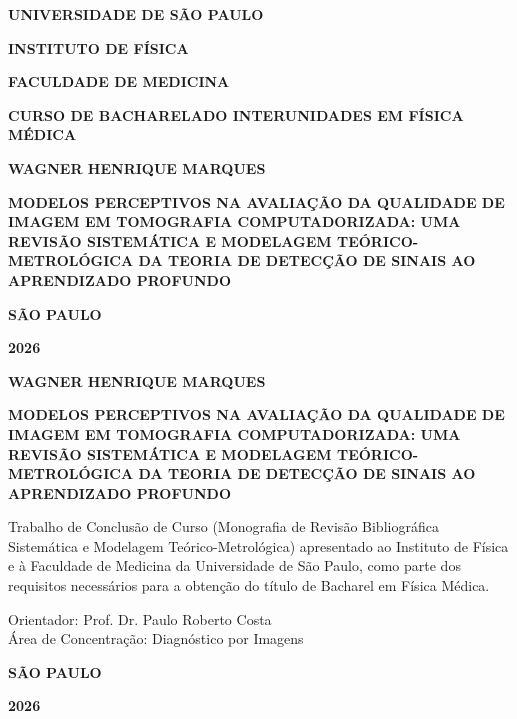 \documentclass[
  12pt,
  a4paper,
  oneside
]{report}
\newcommand{\tccuniversidade}{UNIVERSIDADE DE SÃO PAULO}
\newcommand{\tccinstituto}{INSTITUTO DE FÍSICA}
\newcommand{\tccdepartamento}{FACULDADE DE MEDICINA}
\newcommand{\tcccurso}{CURSO DE BACHARELADO INTERUNIDADES EM FÍSICA MÉDICA}
\newcommand{\tccautor}{WAGNER HENRIQUE MARQUES}
\newcommand{\tcctitulo}{MODELOS PERCEPTIVOS NA AVALIAÇÃO DA QUALIDADE DE IMAGEM EM TOMOGRAFIA COMPUTADORIZADA: UMA REVISÃO SISTEMÁTICA E MODELAGEM TEÓRICO-METROLÓGICA DA TEORIA DE DETECÇÃO DE SINAIS AO APRENDIZADO PROFUNDO}
\newcommand{\tccorientador}{Prof. Dr. Paulo Roberto Costa}
\newcommand{\tccarea}{Diagnóstico por Imagens}
\newcommand{\tcccidade}{SÃO PAULO}
\newcommand{\tccano}{2026}
\begin{document}
\pagestyle{empty}

\begin{center}
  {\bfseries\large \tccuniversidade \par}
  {\bfseries\large \tccinstituto \par}
  {\bfseries\large \tccdepartamento \par}
  {\bfseries\normalsize \tcccurso \par}

  \vspace{3.5cm}

  {\bfseries\Large \tccautor \par}

  \vspace{3.0cm}

  {\bfseries\large \tcctitulo \par}

  \vfill

  {\bfseries\large \tcccidade \par}
  {\bfseries\large \tccano \par}
\end{center}
\clearpage

\begin{center}
  {\bfseries\Large \tccautor \par}

  \vspace{3.5cm}

  {\bfseries\large \tcctitulo \par}

  \vspace{2.5cm}

  \begin{flushright}
    \begin{minipage}{0.55\textwidth}
      \small\raggedright
      Trabalho de Conclusão de Curso (Monografia de Revisão Bibliográfica Sistemática e Modelagem Teórico-Metrológica) apresentado ao Instituto de Física e à Faculdade de Medicina da Universidade de São Paulo, como parte dos requisitos necessários para a obtenção do título de Bacharel em Física Médica.
      
      \vspace{0.5cm}
      Orientador: \tccorientador\\
      Área de Concentração: \tccarea
    \end{minipage}
  \end{flushright}

  \vfill

  {\bfseries\large \tcccidade \par}
  {\bfseries\large \tccano \par}
\end{center}
\clearpage
\end{document}
